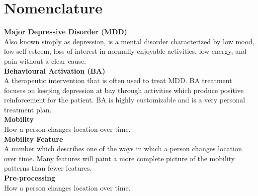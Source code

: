 
\chapter{Nomenclature}
\begin{acronym}[TDMA]
\end{acronym}

\textbf{Major Depressive Disorder (MDD)}\\
Also known simply as depression, is a mental disorder characterized by low mood, low self-esteem, loss of interest in normally enjoyable activities, low energy, and pain without a clear cause.\\

\textbf{Behavioural Activation (BA)}\\
A therapeutic intervention that is often used to treat MDD. BA treatment focuses on keeping depression at bay through activities which produce positive reinforcement for the patient. BA is highly customizable and is a very personal treatment plan.\\

\textbf{Mobility}\\
How a person changes location over time.\\

\textbf{Mobility Feature}\\
A number which describes one of the ways in which a person changes location over time. Many features will paint a more complete picture of the mobility patterns than fewer features.\\

\textbf{Pre-processing}\\
How a person changes location over time.\\



